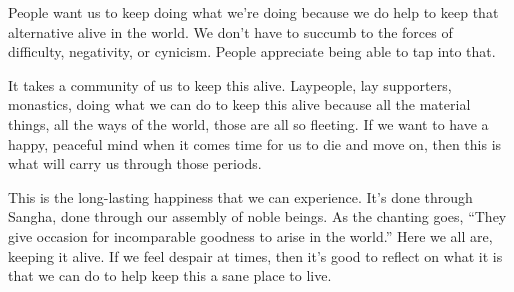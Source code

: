 People want us to keep doing what we're doing because we do help to keep that alternative alive in the world. We don't have to succumb to the forces of difficulty, negativity, or cynicism. People appreciate being able to tap into that.

It takes a community of us to keep this alive. Laypeople, lay supporters, monastics, doing what we can do to keep this alive because all the material things, all the ways of the world, those are all so fleeting. If we want to have a happy, peaceful mind when it comes time for us to die and move on, then this is what will carry us through those periods.

This is the long-lasting happiness that we can experience. It's done through Sangha, done through our assembly of noble beings. As the chanting goes, ``They give occasion for incomparable goodness to arise in the world.'' Here we all are, keeping it alive. If we feel despair at times, then it's good to reflect on what it is that we can do to help keep this a sane place to live.
